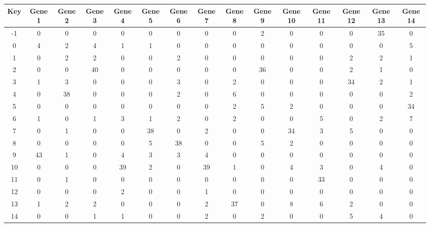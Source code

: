 \begin{tabular}{|c|c|c|c|c|c|c|c|c|c|c|c|c|c|c|}
\hline
Key & Gene 1 & Gene 2 & Gene 3 & Gene 4 & Gene 5 & Gene 6 & Gene 7 & Gene 8 & Gene 9 & Gene 10 & Gene 11 & Gene 12 & Gene 13 & Gene 14 \\
\hline
-1 & 0 & 0 & 0 & 0 & 0 & 0 & 0 & 0 & 2 & 0 & 0 & 0 & 35 & 0 \\
0 & 4 & 2 & 4 & 1 & 1 & 0 & 0 & 0 & 0 & 0 & 0 & 0 & 0 & 5 \\
1 & 0 & 2 & 2 & 0 & 0 & 2 & 0 & 0 & 0 & 0 & 0 & 2 & 2 & 1 \\
2 & 0 & 0 & 40 & 0 & 0 & 0 & 0 & 0 & 36 & 0 & 0 & 2 & 1 & 0 \\
3 & 1 & 3 & 0 & 0 & 0 & 3 & 0 & 2 & 0 & 0 & 0 & 34 & 2 & 1 \\
4 & 0 & 38 & 0 & 0 & 0 & 2 & 0 & 6 & 0 & 0 & 0 & 0 & 0 & 2 \\
5 & 0 & 0 & 0 & 0 & 0 & 0 & 0 & 2 & 5 & 2 & 0 & 0 & 0 & 34 \\
6 & 1 & 0 & 1 & 3 & 1 & 2 & 0 & 2 & 0 & 0 & 5 & 0 & 2 & 7 \\
7 & 0 & 1 & 0 & 0 & 38 & 0 & 2 & 0 & 0 & 34 & 3 & 5 & 0 & 0 \\
8 & 0 & 0 & 0 & 0 & 5 & 38 & 0 & 0 & 5 & 2 & 0 & 0 & 0 & 0 \\
9 & 43 & 1 & 0 & 4 & 3 & 3 & 4 & 0 & 0 & 0 & 0 & 0 & 0 & 0 \\
10 & 0 & 0 & 0 & 39 & 2 & 0 & 39 & 1 & 0 & 4 & 3 & 0 & 4 & 0 \\
11 & 0 & 1 & 0 & 0 & 0 & 0 & 0 & 0 & 0 & 0 & 33 & 0 & 0 & 0 \\
12 & 0 & 0 & 0 & 2 & 0 & 0 & 1 & 0 & 0 & 0 & 0 & 0 & 0 & 0 \\
13 & 1 & 2 & 2 & 0 & 0 & 0 & 2 & 37 & 0 & 8 & 6 & 2 & 0 & 0 \\
14 & 0 & 0 & 1 & 1 & 0 & 0 & 2 & 0 & 2 & 0 & 0 & 5 & 4 & 0 \\
\hline
\end{tabular}